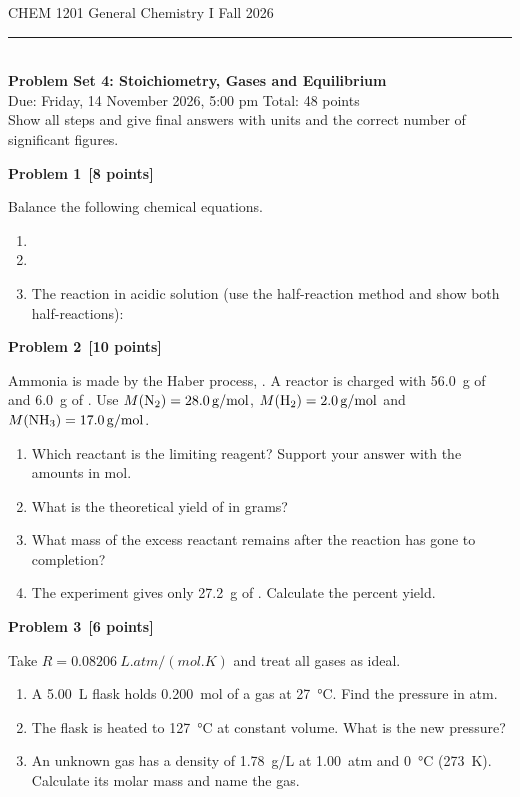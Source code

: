 \documentclass[11pt,a4paper]{article}
\newcommand{\problem}[2]{\bigskip\par\textbf{Problem #1}\ \textbf{[#2]}\par\nopagebreak\smallskip}
\begin{document}
{\small CHEM 1201 \textperiodcentered{} General Chemistry I \hfill Fall 2026}\\[-0.4em]
\rule{\linewidth}{0.6pt}\\[0.5em]
{\Large\bfseries Problem Set 4: Stoichiometry, Gases and Equilibrium}\\[0.5em]
Due: Friday, 14 November 2026, 5:00 pm \hfill Total: 48 points\\[0.3em]
{\small Show all steps and give final answers with units and the correct number of significant figures.}

\problem{1}{8 points}
Balance the following chemical equations.
\begin{enumerate}
  \item {}
  \item {}
  \item The reaction in acidic solution (use the half-reaction method and show both half-reactions):
\end{enumerate}

\problem{2}{10 points}
Ammonia is made by the Haber process, . A reactor is charged with
\qty{56.0}{g} of  and \qty{6.0}{g} of . Use $M(\ce{N2}) = \qty{28.0}{g/mol}$,
$M(\ce{H2}) = \qty{2.0}{g/mol}$ and $M(\ce{NH3}) = \qty{17.0}{g/mol}$.
\begin{enumerate}
  \item Which reactant is the limiting reagent? Support your answer with the amounts in mol.
  \item What is the theoretical yield of  in grams?
  \item What mass of the excess reactant remains after the reaction has gone to completion?
  \item The experiment gives only \qty{27.2}{g} of . Calculate the percent yield.
\end{enumerate}

\problem{3}{6 points}
Take $R = \qty{0.08206}{L.atm/(mol.K)}$ and treat all gases as ideal.
\begin{enumerate}
  \item A \qty{5.00}{L} flask holds \qty{0.200}{mol} of a gas at \qty{27}{\celsius}. Find the pressure in atm.
  \item The flask is heated to \qty{127}{\celsius} at constant volume. What is the new pressure?
  \item An unknown gas has a density of \qty{1.78}{g/L} at \qty{1.00}{atm} and \qty{0}{\celsius}
        (\qty{273}{K}). Calculate its molar mass and name the gas.
\end{enumerate}
\end{document}
